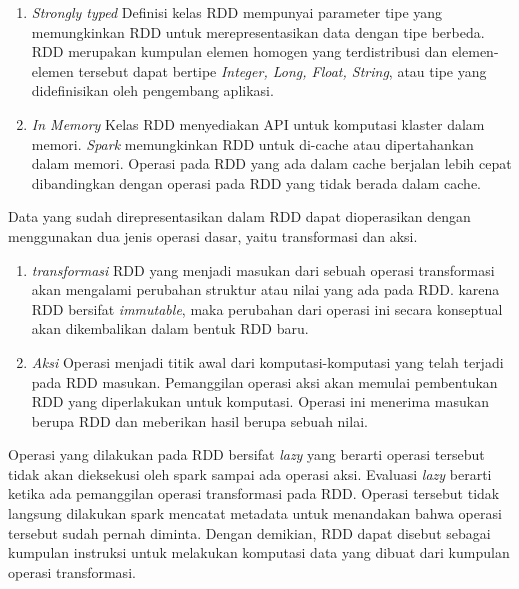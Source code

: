 \documentclass[a4paper,twoside]{article}
\begin{document}
\begin{enumerate}
\begin{enumerate}
	\item{\textit{Strongly typed}\newline
	Definisi kelas RDD mempunyai parameter tipe yang memungkinkan RDD untuk 								merepresentasikan data dengan tipe berbeda. RDD merupakan kumpulan elemen homogen yang 					terdistribusi dan elemen-elemen tersebut dapat bertipe \textit{Integer, Long, Float, 					String}, atau tipe yang didefinisikan oleh pengembang aplikasi.
	}
	
	\item{\textit{In Memory}\newline
	Kelas RDD menyediakan API untuk komputasi klaster dalam memori. \textit{Spark} 							memungkinkan RDD untuk di-cache atau dipertahankan dalam memori. Operasi pada RDD yang 					ada dalam cache berjalan lebih cepat dibandingkan dengan operasi pada RDD yang tidak 					berada dalam cache.
	}
\end{enumerate}

Data yang sudah direpresentasikan dalam RDD dapat dioperasikan dengan menggunakan dua jenis operasi dasar, yaitu transformasi dan aksi.
\begin{enumerate}
	\item{\textit{transformasi}\newline
	RDD yang menjadi masukan dari sebuah operasi transformasi akan mengalami perubahan struktur 			atau nilai yang ada pada RDD. karena RDD bersifat \textit{immutable}, maka perubahan dari 				operasi ini secara konseptual akan dikembalikan dalam bentuk RDD baru.
	}
	
	\item{\textit{Aksi}\newline
	Operasi menjadi titik awal dari komputasi-komputasi yang telah terjadi pada RDD masukan. 				Pemanggilan operasi aksi akan memulai pembentukan RDD yang diperlakukan untuk komputasi. 				Operasi ini menerima masukan berupa RDD dan meberikan hasil berupa sebuah nilai.
	}
\end{enumerate}

Operasi yang dilakukan pada RDD bersifat \textit{lazy} yang berarti operasi tersebut tidak akan dieksekusi oleh spark sampai ada operasi aksi. Evaluasi \textit{lazy} berarti ketika ada pemanggilan operasi transformasi pada RDD. Operasi tersebut tidak langsung dilakukan spark mencatat metadata untuk menandakan bahwa operasi tersebut sudah pernah diminta. Dengan demikian, RDD dapat disebut sebagai kumpulan instruksi untuk melakukan komputasi data yang dibuat dari kumpulan operasi transformasi.


\end{enumerate}
\end{document}
